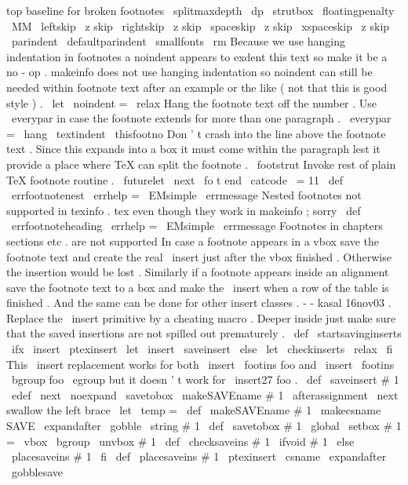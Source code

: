 {{{{{{%
top
baseline
for
broken
footnotes
\
splitmaxdepth
\
dp
\
strutbox
\
floatingpenalty
\
MM
\
leftskip
\
z
skip
\
rightskip
\
z
skip
\
spaceskip
\
z
skip
\
xspaceskip
\
z
skip
\
parindent
\
defaultparindent
%
\
smallfonts
\
rm
%
%
Because
we
use
hanging
indentation
in
footnotes
a
noindent
appears
%
to
exdent
this
text
so
make
it
be
a
no
-
op
.
makeinfo
does
not
use
%
hanging
indentation
so
noindent
can
still
be
needed
within
footnote
%
text
after
an
example
or
the
like
(
not
that
this
is
good
style
)
.
\
let
\
noindent
=
\
relax
%
%
Hang
the
footnote
text
off
the
number
.
Use
\
everypar
in
case
the
%
footnote
extends
for
more
than
one
paragraph
.
\
everypar
=
{
\
hang
}
%
\
textindent
{
\
thisfootno
}
%
%
%
Don
'
t
crash
into
the
line
above
the
footnote
text
.
Since
this
%
expands
into
a
box
it
must
come
within
the
paragraph
lest
it
%
provide
a
place
where
TeX
can
split
the
footnote
.
\
footstrut
%
%
Invoke
rest
of
plain
TeX
footnote
routine
.
\
futurelet
\
next
\
fo
t
}
}
%
end
\
catcode
\
=
11
\
def
\
errfootnotenest
{
%
\
errhelp
=
\
EMsimple
\
errmessage
{
Nested
footnotes
not
supported
in
texinfo
.
tex
even
though
they
work
in
makeinfo
;
sorry
}
}
\
def
\
errfootnoteheading
{
%
\
errhelp
=
\
EMsimple
\
errmessage
{
Footnotes
in
chapters
sections
etc
.
are
not
supported
}
}
%
In
case
a
footnote
appears
in
a
vbox
save
the
footnote
text
and
create
%
the
real
\
insert
just
after
the
vbox
finished
.
Otherwise
the
insertion
%
would
be
lost
.
%
Similarly
if
a
footnote
appears
inside
an
alignment
save
the
footnote
%
text
to
a
box
and
make
the
\
insert
when
a
row
of
the
table
is
finished
.
%
And
the
same
can
be
done
for
other
insert
classes
.
-
-
kasal
16nov03
.
%
%
Replace
the
\
insert
primitive
by
a
cheating
macro
.
%
Deeper
inside
just
make
sure
that
the
saved
insertions
are
not
spilled
%
out
prematurely
.
%
\
def
\
startsavinginserts
{
%
\
ifx
\
insert
\
ptexinsert
\
let
\
insert
\
saveinsert
\
else
\
let
\
checkinserts
\
relax
\
fi
}
%
This
\
insert
replacement
works
for
both
\
insert
\
footins
{
foo
}
and
%
\
insert
\
footins
\
bgroup
foo
\
egroup
but
it
doesn
'
t
work
for
\
insert27
{
foo
}
.
%
\
def
\
saveinsert
#
1
{
%
\
edef
\
next
{
\
noexpand
\
savetobox
\
makeSAVEname
#
1
}
%
\
afterassignment
\
next
%
swallow
the
left
brace
\
let
\
temp
=
}
\
def
\
makeSAVEname
#
1
{
\
makecsname
{
SAVE
\
expandafter
\
gobble
\
string
#
1
}
}
\
def
\
savetobox
#
1
{
\
global
\
setbox
#
1
=
\
vbox
\
bgroup
\
unvbox
#
1
}
\
def
\
checksaveins
#
1
{
\
ifvoid
#
1
\
else
\
placesaveins
#
1
\
fi
}
\
def
\
placesaveins
#
1
{
%
\
ptexinsert
\
csname
\
expandafter
\
gobblesave
}}}}}
